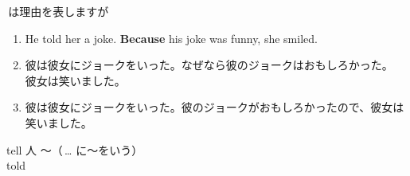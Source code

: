 \documentclass[aspectratio=169,xcolor={dvipsnames,table}]{beamer}
\begin{document}
\begin{frame}[plain]{\,は理由を表しますが}
 
\begin{enumerate}
 \item<1-> He told her a joke. \textbf{Because} his joke was funny, she smiled.
 \item<2-> 彼は彼女にジョークをいった。なぜなら彼のジョークはおもしろかった。
彼女は笑いました。
 \item<4-> 彼は彼女にジョークをいった。彼のジョークがおもしろかったので、彼女は笑いました。
 \end{enumerate}

\bigskip



\vspace*{20pt}

\hfill{\scriptsize tell 人 ～（\,\ldots\,\,に～をいう）}\\
\hfill{\scriptsize told }
\end{frame}
\end{document}
